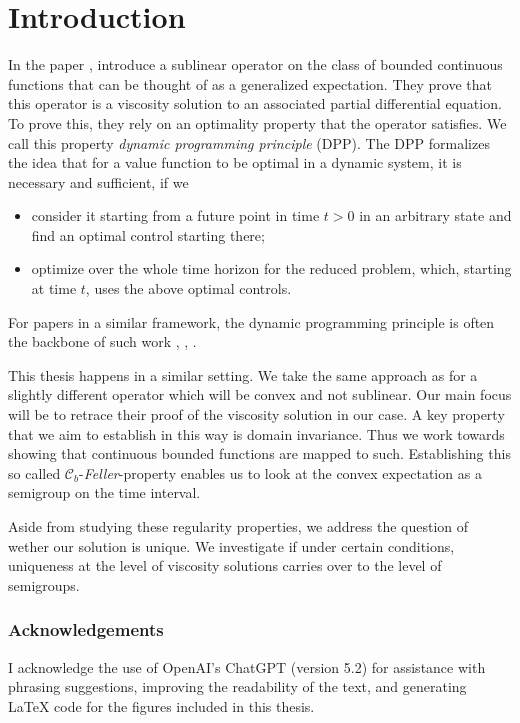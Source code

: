\chapter*{Introduction}

In the paper \cite{MSFPND}, \citeauthor{MSFPND} introduce a sublinear operator on the class of bounded continuous functions that can be thought of as a generalized expectation. They prove that this operator is a viscosity solution to an associated partial differential equation. To prove this, they rely on an optimality property that the operator satisfies. We call this property \emph{dynamic programming principle} (DPP). The DPP formalizes the idea that for a value function to be optimal in a dynamic system, it is necessary and sufficient, if we
\begin{itemize}
	\item consider it starting from a future point in time $t > 0$ in an arbitrary state and find an optimal control starting there;
	\item optimize over the whole time horizon for the reduced problem, which, starting at time $t$, uses the above optimal controls.
\end{itemize}
For papers in a similar framework, the dynamic programming principle is often the backbone of such work \cite[p.64]{Pham}, \cite[p. 6]{CriensJEE}, \cite[thm. 2.3]{Nutz}.

This thesis happens in a similar setting. We take the same approach as \citeauthor{MSFPND} for a slightly different operator which will be convex and not sublinear. Our main focus will be to retrace their proof of the viscosity solution in our case. A key property that we aim to establish in this way is domain invariance. Thus we work towards showing that continuous bounded functions are mapped to such. Establishing this so called $\mathcal{C}_b$-\emph{Feller}-property enables us to look at the convex expectation as a semigroup on the time interval.

Aside from studying these regularity properties, we address the question of wether our solution is unique. We investigate if under certain conditions, uniqueness at the level of viscosity solutions carries over to the level of semigroups. \newpage


	\subsection*{Acknowledgements}
I acknowledge the use of OpenAI’s ChatGPT (version 5.2) for assistance with phrasing suggestions, improving the readability of the text, and generating LaTeX code for the figures included in this thesis.

